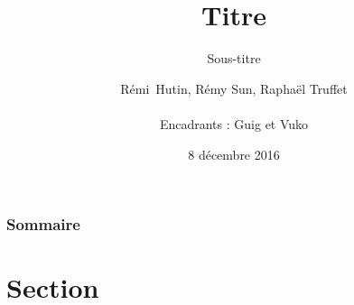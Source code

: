 \documentclass[11pt,english]{beamer}
\title{Titre}
\subtitle{Sous-titre}
\author{Rémi~Hutin, Rémy Sun, Raphaël Truffet\\ \\Encadrants : Guig et Vuko}
\institute{ENS Rennes, IRISA}
\date{8 décembre 2016}
\begin{document}
\begin{frame}
    \titlepage
\end{frame}

\begin{frame}
    \frametitle{Sommaire}
    \tableofcontents[hideallsubsections]
\end{frame}


\section{Section}
\end{document}
